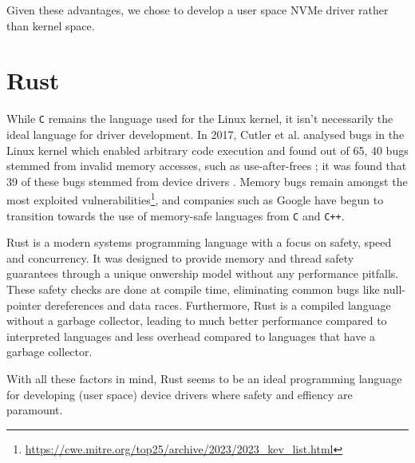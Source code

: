 Given these advantages, we chose to develop a user space NVMe driver rather than kernel space.

\section{Rust}
While \texttt{C} remains the language used for the Linux kernel, it isn't necessarily the ideal language for driver development. In 2017, Cutler et al. analysed bugs in the Linux kernel which enabled arbitrary code execution and found out of 65, 40 bugs stemmed from invalid memory accesses, such as use-after-frees \cite{cutler}; it was found that 39 of these bugs stemmed from device drivers \cite{driver_lang}. Memory bugs remain amongst the most exploited vulnerabilities\footnote{\url{https://cwe.mitre.org/top25/archive/2023/2023_kev_list.html}}, and companies such as Google have begun to transition towards the use of memory-safe languages from \texttt{C} and \texttt{C++}.

Rust is a modern systems programming language with a focus on safety, speed and concurrency. It was designed to provide memory and thread safety guarantees through a unique onwership model without any performance pitfalls. These safety checks are done at compile time, eliminating common bugs like null-pointer dereferences and data races. Furthermore, Rust is a compiled language without a garbage collector, leading to much better performance compared to interpreted languages and less overhead compared to languages that have a garbage collector.

With all these factors in mind, Rust seems to be an ideal programming language for developing (user space) device drivers where safety and effiency are paramount.
